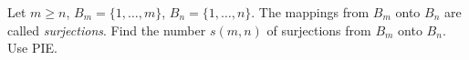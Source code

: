 Let $m \geq n$, $B_m = \{1, \ldots, m\}$, $B_n = \{1, \ldots, n\}$. The mappings from $B_m$ onto $B_n$ are called \emph{surjections}. Find the number $s(m, n)$ of surjections from $B_m$ onto $B_n$. Use PIE.
